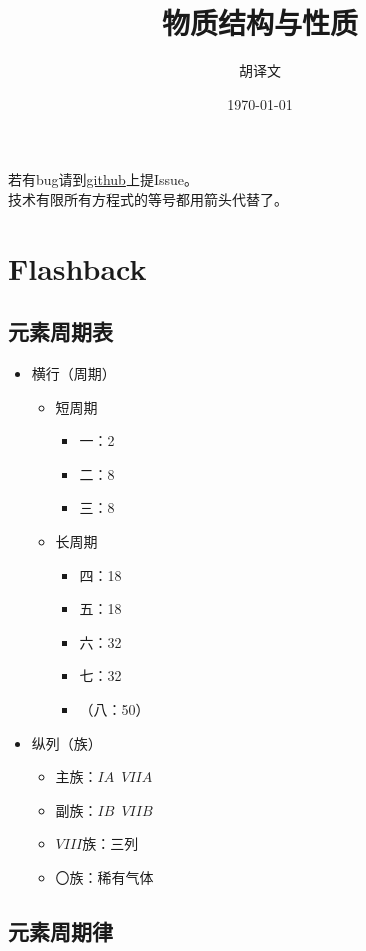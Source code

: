 \documentclass[a4paper]{article}
\title{物质结构与性质}
\author{胡译文}
\date{\today}
\renewcommand\contentsname{目录}
\begin{document}
	\maketitle
	\begin{center}
		若有bug请到{\color{red}\href{https://github.com/huyiwen/Chem}{github}}上提Issue。\\
		技术有限所有方程式的等号都用箭头代替了。
	\end{center}
	\renewcommand\contentsname{目录}
	\tableofcontents
	
	
	\clearpage
	\section*{Flashback}
	\subsection{元素周期表}
	\begin{itemize}
		\item 横行（周期）
		\begin{itemize}
			\item 短周期
			\begin{itemize}
				\item 一：2
				\item 二：8
				\item 三：8
			\end{itemize}
			\item 长周期
			\begin{itemize}
				\item 四：18
				\item 五：18
				\item 六：32
				\item 七：32
				\item （八：50）
			\end{itemize}
		\end{itemize}
		\item 纵列（族）
		\begin{itemize}
			\item 主族：$IA$~$VIIA$
			\item 副族：$IB$~$VIIB$
			\item $VIII$族：三列
			\item 〇族：稀有气体
		\end{itemize}
	\end{itemize}
	\subsection{元素周期律}
\end{document}
